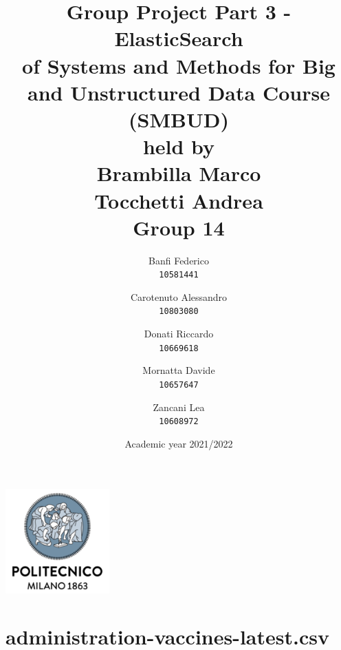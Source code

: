 \documentclass[a4paper,12pt]{article}
\begin{document}
\title{%
  Group Project Part 3 - ElasticSearch \\
  \large of Systems and Methods for Big
    and Unstructured Data Course \\(SMBUD)\\
    held by\\ Brambilla Marco\\ Tocchetti Andrea \\
  \vspace{5mm}
  \Large \textbf{Group 14}}
\author{Banfi Federico\\
  \texttt{10581441}
  \and
  Carotenuto Alessandro\\
  \texttt{10803080}
  \and
  Donati Riccardo\\
  \texttt{10669618}
  \and
  Mornatta Davide\\
  \texttt{10657647}
  \and
  Zancani Lea\\
  \texttt{10608972}}
\date{Academic year 2021/2022}
\maketitle
\begin{center}
  \includegraphics[width=4cm]{polilogo.png}\\
\end{center}
\newpage
\section{administration-vaccines-latest.csv}
\end{document}
